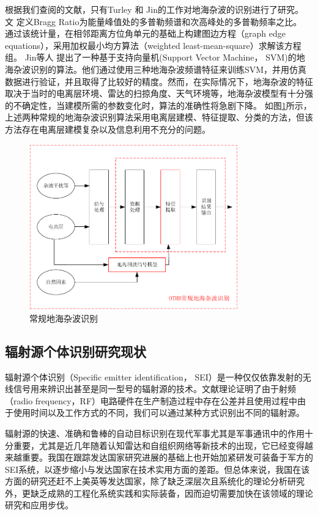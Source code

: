 根据我们查阅的文献，只有Turley 和 Jin的工作对地海杂波的识别进行了研究。
文 \cite{turley2013high}定义Bragg Ratio为能量峰值处的多普勒频谱和次高峰处的多普勒频率之比。
通过该统计量，在相邻距离方位角单元的基础上构建图边方程（graph edge equations），采用加权最小均方算法（weighted least-mean-square）求解该方程组。
Jin等人 提出了一种基于支持向量机(Support Vector Machine， SVM)的地海杂波识别的算法。他们通过使用三种地海杂波频谱特征来训练SVM，并用仿真数据进行验证，并且取得了比较好的精度。然而，在实际情况下，地海杂波的特征取决于当时的电离层环境、雷达的扫掠角度、天气环境等，地海杂波模型有十分强的不确定性，当建模所需的参数变化时，算法的准确性将急剧下降。
如图\ref{fig:othr_tradition}所示，上述两种常规的地海杂波识别算法采用电离层建模、特征提取、分类的方法，但该方法存在电离层建模复杂以及信息利用不充分的问题。
\begin{figure}[hbt]
	\centering
	\includegraphics[width=9cm]{figures/introduction/othr_tradition}
	\caption{常规地海杂波识别}
	\label{fig:othr_tradition}
\end{figure}

\subsection{辐射源个体识别研究现状}
辐射源个体识别（Specific emitter identification， SEI）是一种仅仅依靠发射的无线信号用来辨识出甚至是同一型号的辐射源的技术。文献\cite{danev2012physical}理论证明了由于射频（radio frequency，RF）电路硬件在生产制造过程中存在公差并且使用过程中由于使用时间以及工作方式的不同，我们可以通过某种方式识别出不同的辐射源。

辐射源的快速、准确和鲁棒的自动目标识别在现代军事尤其是军事通讯中的作用十分重要，尤其是近几年随着认知雷达和自组织网络等新技术的出现，它已经变得越来越重要。我国在跟踪发达国家研究进展的基础上也开始加紧研发可装备于军方的SEI系统，以逐步缩小与发达国家在技术实用方面的差距。但总体来说，我国在该方面的研究还赶不上美英等发达国家，除了缺乏深层次且系统化的理论分析研究外，更缺乏成熟的工程化系统实践和实际装备，因而迫切需要加快在该领域的理论研究和应用步伐。

